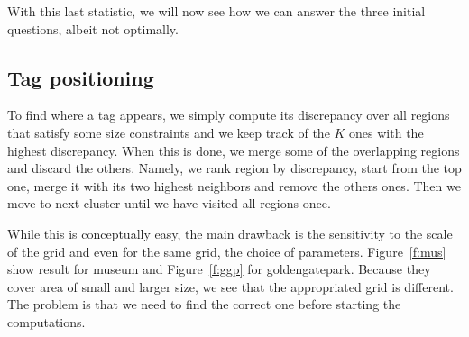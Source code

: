 With this last statistic, we will now see how we can answer the three initial
questions, albeit not optimally.

\subsection{Tag positioning}

To find where a tag appears, we simply compute its discrepancy over all
regions that satisfy some size constraints and we keep track of the $K$ ones
with the highest discrepancy. When this is done, we merge some of the
overlapping regions and discard the others. Namely, we rank region by
discrepancy, start from the top one, merge it with its two highest neighbors
and remove the others ones. Then we move to next cluster until we have visited
all regions once.

While this is conceptually easy, the main drawback is the sensitivity to the
scale of the grid and even for the same grid, the choice of parameters.
Figure~\vref{f:mus} show result for \textsf{museum} and Figure~\vref{f:ggp}
for \textsf{goldengatepark}. Because they cover area of small and larger size,
we see that the appropriated grid is different. The problem is that we need to
find the correct one before starting the computations.

